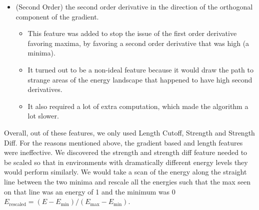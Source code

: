 \begin{itemize}
\begin{itemize}
        When you're in a valley moving between the minima on the minimum energy pathway your path will have gradient zero in every direction, because otherwise you would be able to move to get a lower path.
        Every direction that is, except the direction of the path, because it may need to be moving up a gradient to be getting to a goal in the direction of the path.
        \item This feature is meant to incentivise a small orthogonal gradient, meant to favor paths at the bottom of the valley.
        \item This feature did not work well, because in addition to favoring the bottom of the valley the feature also favors the ridge of a hill, since using the first derivative alone cannot distinguish between a minima and a maxima.
        See Figure~\ref{fig:grad_incorrect} for an example.
    \end{itemize}
    \begin{figure}[h]
        \centering
        \texttt{[image: incorrect paths.png]}
        \caption{A selection of MPMP generated paths with the gradient feature on (no second order). You can see that the green and blue paths head directly for the maxima.}
        \label{fig:grad_incorrect}
    \end{figure}
    \item (Second Order) the second order derivative in the direction of the orthogonal component of the gradient.
    \begin{itemize}
        \item This feature was added to stop the issue of the first order derivative favoring maxima, by favoring a second order derivative that was high (a minima).
        \item It turned out to be a non-ideal feature because it would draw the path to strange areas of the energy landscape that happened to have high second derivatives.
        \item It also required a lot of extra computation, which made the algorithm a lot slower.
    \end{itemize}
\end{itemize}

Overall, out of these features, we only used Length Cutoff, Strength and Strength Diff.
For the reasons mentioned above, the gradient based and length features were ineffective.
We discovered the strength and strength diff feature needed to be scaled so that in environments with dramatically different energy levels they would perform similarly.
We would take a scan of the energy along the straight line between the two minima and rescale all the energies such that the max seen on that line was an energy of 1 and the minimum was 0 $E_{\text{rescaled}} = (E - E_{\min})/(E_{\max}-E_{\min})$.

